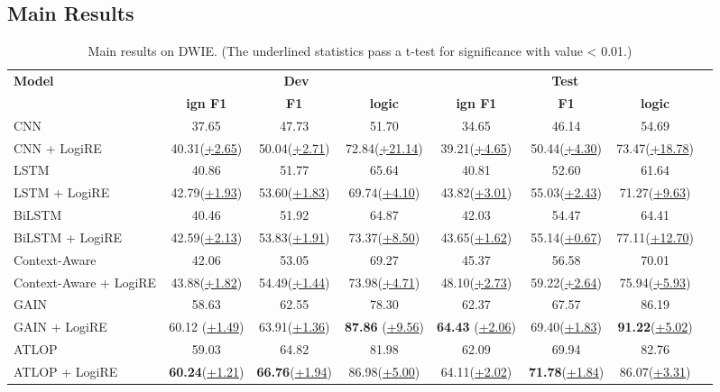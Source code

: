 \documentclass[11pt]{article}
\newcommand{\mymodel}{LogiRE\xspace}
\begin{document}
\subsection{Main Results}
\begin{table*}[t]
    \scriptsize
    \centering
    \begin{tabular}{lccccccc}
    \toprule
        \multirow{2}{*}{\bf Model} & \multicolumn{3}{c}{\bf Dev} & \multicolumn{3}{c}{\bf Test} \\ \cmidrule(lr){2-4} \cmidrule(lr){5-7}
        & \bf ign F1 & \bf F1  & \bf logic & \bf ign F1 & \bf F1 & \bf logic \\ \midrule
          CNN  & 37.65 & 47.73 & 51.70 & 34.65 & 46.14 & 54.69 \\
         CNN + \mymodel & {40.31}(\underline{+2.65}) & {50.04}(\underline{+2.71}) & {72.84}(\underline{+21.14}) & {39.21}(\underline{+4.65}) & {50.44}(\underline{+4.30}) & {73.47}(\underline{+18.78}) \\
          \midrule
        LSTM  & 40.86 & 51.77 & 65.64 & 40.81 & 52.60 & 61.64 \\
        LSTM + \mymodel & 42.79(\underline{+1.93}) & 53.60(\underline{+1.83}) & 69.74(\underline{+4.10}) & 43.82(\underline{+3.01}) & 55.03(\underline{+2.43}) & 71.27(\underline{+9.63}) \\
        \midrule
        BiLSTM  & 40.46 & 51.92 & 64.87 & 42.03 & 54.47 & 64.41 \\
        BiLSTM + \mymodel & 42.59(\underline{+2.13}) & 53.83(\underline{+1.91}) & 73.37(\underline{+8.50}) & 43.65(\underline{+1.62}) & 55.14(\underline{+0.67}) & 77.11(\underline{+12.70}) \\
        \midrule
        Context-Aware & 42.06 & 53.05 & 69.27 & 45.37 & 56.58 & 70.01 \\
        Context-Aware + \mymodel & 43.88(\underline{+1.82}) & 54.49(\underline{+1.44}) & 73.98(\underline{+4.71}) & 48.10(\underline{+2.73}) & 59.22(\underline{+2.64}) & 75.94(\underline{+5.93}) \\
        \midrule
        GAIN  & 58.63 & 62.55 & 78.30 & 62.37 & 67.57 & 86.19 \\ 
        GAIN + \mymodel & 60.12 (\underline{+1.49}) & 63.91(\underline{+1.36}) & \textbf{87.86} (\underline{+9.56}) & \textbf{64.43} (\underline{+2.06}) & 69.40(\underline{+1.83}) & \textbf{91.22}(\underline{+5.02}) \\
        \midrule
        ATLOP  & 59.03 & 64.82  & 81.98 & 62.09 & 69.94 & 82.76 \\ 
        ATLOP + \mymodel & \textbf{60.24}(\underline{+1.21}) & \textbf{66.76}(\underline{+1.94}) & 86.98(\underline{+5.00}) & 64.11(\underline{+2.02})  & \textbf{71.78}(\underline{+1.84}) & 86.07(\underline{+3.31}) \\
        \bottomrule
    \end{tabular}
    \caption{Main results on DWIE. (The underlined statistics pass a t-test for significance with  value < 0.01.)}
    \label{tab:dwie}
\end{table*}
\end{document}
